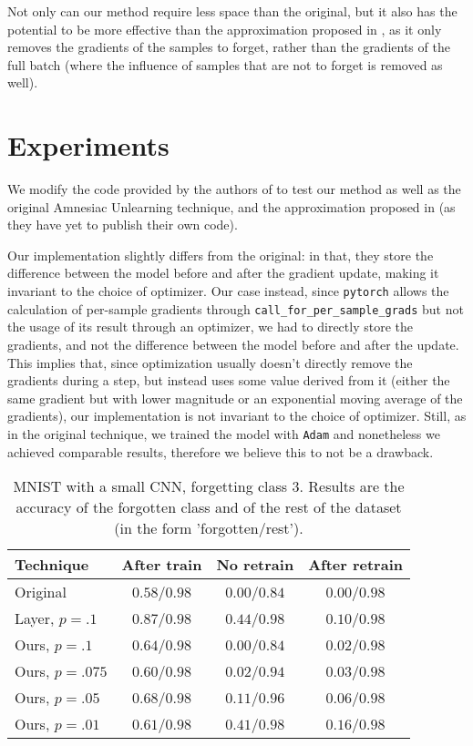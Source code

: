 \documentclass{article}
\begin{document}
Not only can our method require less space than the original, but it also has the potential to be more effective than the approximation proposed in \cite{gogineni2024efficient}, as it only removes the gradients of the samples to forget, rather than the gradients of the full batch (where the influence of samples that are not to forget is removed as well).

\section{Experiments} We modify the code provided by the authors of \cite{graves2021amnesiac} to test our method as well as the original Amnesiac Unlearning technique, and the approximation proposed in \cite{gogineni2024efficient} (as they have yet to publish their own code).

Our implementation slightly differs from the original: in that, they store the difference between the model before and after the gradient update, making it invariant to the choice of optimizer. Our case instead, since \texttt{pytorch} allows the calculation of per-sample gradients through \texttt{call\_for\_per\_sample\_grads} but not the usage of its result through an optimizer, we had to directly store the gradients, and not the difference between the model before and after the update. This implies that, since optimization usually doesn't directly remove the gradients during a step, but instead uses some value derived from it (either the same gradient but with lower magnitude or an exponential moving average of the gradients), our implementation is not invariant to the choice of optimizer. Still, as in the original technique, we trained the model with \texttt{Adam} and nonetheless we achieved comparable results, therefore we believe this to not be a drawback. 

\begin{table}
\centering
\caption{MNIST with a small CNN, forgetting class $3$. Results are the accuracy of the forgotten class and of the rest of the dataset (in the form 'forgotten/rest').}
\label{tab:mnist_small_cnn}
\begin{tabular}{l | c | c c}
    Technique&After train&No retrain&After retrain\\
    \hline
    Original&$0.58$/$0.98$& $0.00$/$0.84$& $0.00$/$0.98$\\
    Layer, $p=.1$&$0.87$/$0.98$& $0.44$/$0.98$& $0.10$/$0.98$\\
    \hline
    Ours, $p=.1$&$0.64$/$0.98$& $0.00$/$0.84$& $0.02$/$0.98$\\
    Ours, $p=.075$&$0.60$/$0.98$&$0.02$/$0.94$& $0.03$/$0.98$\\
    Ours, $p=.05$&$0.68$/$0.98$&$0.11$/$0.96$&$0.06$/$0.98$\\
    Ours, $p=.01$&$0.61$/$0.98$&$0.41$/$0.98$&$0.16$/$0.98$\\
\end{tabular}
\end{table}
\end{document}
